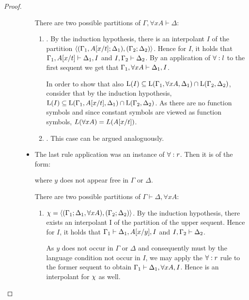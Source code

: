 \begin{proof}
\begin{description}
\begin{itemize}
					There are two possible partitions of $\Gamma, \forall x A \vdash \Delta$:
					\begin{enumerate}
						\item {}.
							By the induction hypothesis, there is an interpolant $I$ of the partition $ \langle (\Gamma_1, A[x/t]; \Delta_1), (\Gamma_2; \Delta_2)\rangle $.
							Hence for $I$, it holds that
							$\Gamma_1, A[x/t] \vdash \Delta_1, I$ and  
							$I, \Gamma_2 \vdash \Delta_2$.
							By an application of $\forall:l$ to the first sequent we get that $\Gamma_1, \forall x A\vdash \Delta_1, I$.

							In order to show that also $\operatorname{L}(I) \subseteq \operatorname{L}(\Gamma_1, \forall x A, \Delta_1) \cap \operatorname{L}(\Gamma_2, \Delta_2)$, consider that by the induction hypothesis, 
							$\operatorname{L}(I) \subseteq \operatorname{L}(\Gamma_1, A[x/t], \Delta_1) \cap \operatorname{L}(\Gamma_2, \Delta_2)$.
							As there are no function symbols and since constant symbols are viewed as function symbols, $L(\forall x A) = L(A[x/t])$.


						\item {}.
							This case can be argued analoguously.
					\end{enumerate}

				\item The last rule application was an instance of $\forall:r$. Then it is of the form:

					\begin{prooftree}
					\end{prooftree}
					where $y$ does not appear free in $\Gamma$ or $\Delta$.

					There are two possible partitions of $\Gamma\vdash \Delta, \forall x A $:
					\begin{enumerate}
						\item $\chi =  \langle (\Gamma_1; \Delta_1, \forall x A), (\Gamma_2; \Delta_2)\rangle $.
							By the induction hypothesis, there exists an interpolant I of the partition 
							 of the upper sequent.
							Hence for $I$, it holds that
							$\Gamma_1 \vdash \Delta_1, A[x/y], I$ and
							$I, \Gamma_2 \vdash \Delta_2$.

							As $y$ does not occur in $\Gamma$ or $\Delta$ and consequently must by the language condition not occur in $I$, we may apply the $\forall:r$ rule to the former sequent to obtain $\Gamma_1 \vdash \Delta_1, \forall x A, I$.
							Hence is an interpolant for $\chi$ as well.


\end{enumerate}
\end{itemize}
\end{description}
\end{proof}
